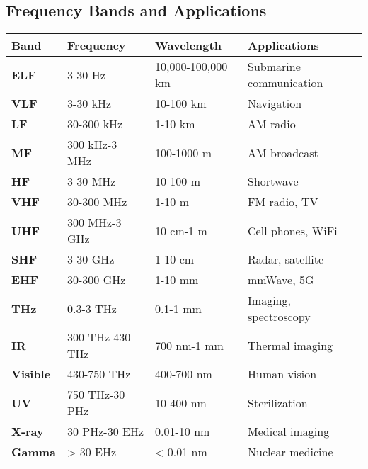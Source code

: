 \begin{center}
\end{center}

\subsection{Frequency Bands and Applications}

{\def\LTcaptype{} %
\begin{longtable}[]{@{}llll@{}}
\toprule\noalign{}
Band & Frequency & Wavelength & Applications \\
\midrule\noalign{}
\endhead
\bottomrule\noalign{}
\endlastfoot
\textbf{ELF} & 3-30 Hz & 10,000-100,000 km & Submarine communication \\
\textbf{VLF} & 3-30 kHz & 10-100 km & Navigation \\
\textbf{LF} & 30-300 kHz & 1-10 km & AM radio \\
\textbf{MF} & 300 kHz-3 MHz & 100-1000 m & AM broadcast \\
\textbf{HF} & 3-30 MHz & 10-100 m & Shortwave \\
\textbf{VHF} & 30-300 MHz & 1-10 m & FM radio, TV \\
\textbf{UHF} & 300 MHz-3 GHz & 10 cm-1 m & Cell phones, WiFi \\
\textbf{SHF} & 3-30 GHz & 1-10 cm & Radar, satellite \\
\textbf{EHF} & 30-300 GHz & 1-10 mm & mmWave, 5G \\
\textbf{THz} & 0.3-3 THz & 0.1-1 mm & Imaging, spectroscopy \\
\textbf{IR} & 300 THz-430 THz & 700 nm-1 mm & Thermal imaging \\
\textbf{Visible} & 430-750 THz & 400-700 nm & Human vision \\
\textbf{UV} & 750 THz-30 PHz & 10-400 nm & Sterilization \\
\textbf{X-ray} & 30 PHz-30 EHz & 0.01-10 nm & Medical imaging \\
\textbf{Gamma} & \textgreater{} 30 EHz & \textless{} 0.01 nm & Nuclear
medicine \\
\end{longtable}
}

